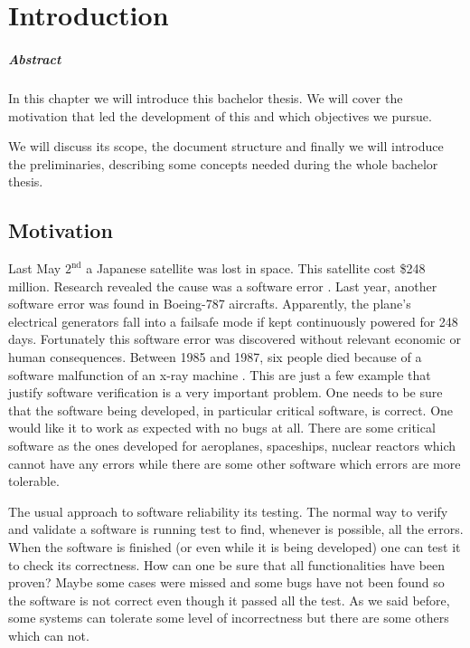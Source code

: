 \chapter{Introduction\label{chap:introduction}}

\paragraph{Abstract}

In this chapter we will introduce this bachelor thesis.
%
We will cover the motivation that led the development of this \thisworkm and which objectives we pursue.

We will discuss its scope, the document structure and finally we will introduce the preliminaries, describing some concepts needed during the whole bachelor thesis. 

\section{Motivation}

\label{Motivation}
Last May $\text{2}^{\text{nd}}$ a Japanese satellite was lost in space. This satellite cost \$248 million.
%
Research revealed the cause was a software error \cite{japaneseSatellite}. 
%
Last year, another software error was found in Boeing-787 aircrafts.
%
Apparently, the plane’s electrical generators fall into a failsafe mode if kept continuously powered 
for 248 days. \cite{boein787}
%
Fortunately this software error was discovered without relevant economic or human consequences.
%
Between 1985 and 1987, six people died because of a software malfunction of an x-ray machine \cite{xraykill}.
%
This are just a few example that justify software verification is a very important problem.
%
One needs to be sure that the software being developed, in particular critical software, is correct.
%
One would like it to work as expected with no bugs at all.
%
There are some critical software as the ones developed for aeroplanes, spaceships, nuclear reactors which cannot have any errors while there are some other software which errors are more tolerable.


The usual approach to software reliability its testing.
% 
The normal way to verify and validate a software is running test to find, whenever is possible, all the errors.
% 
When the software is finished (or even while it is being developed) one can test it to check its correctness.
%
How can one be sure that all functionalities have been proven? Maybe some cases were missed and some bugs have not been found so the software is not correct even though it passed all the test.
%
As we said before, some systems can tolerate some level of incorrectness but there are some others which can not.


